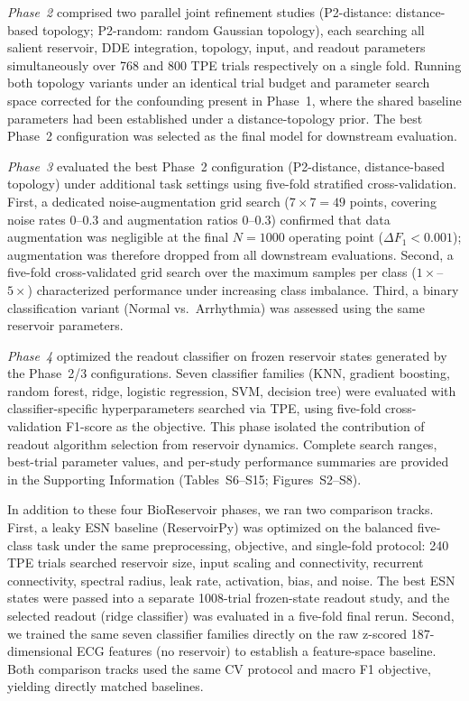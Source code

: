 \documentclass[journal=asbcd6,manuscript=article,keywords]{achemso}
\begin{document}
\textit{Phase~2} comprised two parallel joint refinement studies (P2-distance: distance-based topology; P2-random: random Gaussian topology), each searching all salient reservoir, DDE integration, topology, input, and readout parameters simultaneously over 768 and 800 TPE trials respectively on a single fold. 
Running both topology variants under an identical trial budget and parameter search space corrected for the confounding present in Phase~1, where the shared baseline parameters had been established under a distance-topology prior. 
The best Phase~2 configuration was selected as the final model for downstream evaluation.

\textit{Phase~3} evaluated the best Phase~2 configuration (P2-distance, distance-based topology) under additional task settings using five-fold stratified cross-validation. 
First, a dedicated noise-augmentation grid search ($7 \times 7 = 49$ points, covering noise rates $0$--$0.3$ and augmentation ratios $0$--$0.3$) confirmed that data augmentation was negligible at the final $N = 1000$ operating point ($\Delta F_1 < 0.001$); augmentation was therefore dropped from all downstream evaluations.
Second, a five-fold cross-validated grid search over the maximum samples per class ($1\times$--$5\times$) characterized performance under increasing class imbalance. 
Third, a binary classification variant (Normal vs.\ Arrhythmia) was assessed using the same reservoir parameters.

\textit{Phase~4} optimized the readout classifier on frozen reservoir states generated by the Phase~2/3 configurations. 
Seven classifier families (KNN, gradient boosting, random forest, ridge, logistic regression, SVM, decision tree) were evaluated with classifier-specific hyperparameters searched via TPE, using five-fold cross-validation F1-score as the objective. 
This phase isolated the contribution of readout algorithm selection from reservoir dynamics. 
Complete search ranges, best-trial parameter values, and per-study performance summaries are provided in the Supporting Information (Tables~S6--S15; Figures~S2--S8).

In addition to these four BioReservoir phases, we ran two comparison tracks.
First, a leaky ESN baseline (ReservoirPy) was optimized on the balanced five-class task under the same preprocessing, objective, and single-fold protocol: 240 TPE trials searched reservoir size, input scaling and connectivity, recurrent connectivity, spectral radius, leak rate, activation, bias, and noise.
The best ESN states were passed into a separate 1008-trial frozen-state readout study, and the selected readout (ridge classifier) was evaluated in a five-fold final rerun.
Second, we trained the same seven classifier families directly on the raw z-scored 187-dimensional ECG features (no reservoir) to establish a feature-space baseline.
Both comparison tracks used the same CV protocol and macro F1 objective, yielding directly matched baselines.
\end{document}
